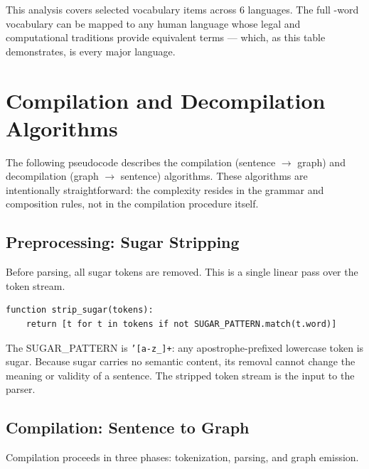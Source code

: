 \documentclass{article}
\begin{document}
This analysis covers selected vocabulary items across 6 languages. The full \VocabTotal-word vocabulary can be mapped to any human language whose legal and computational traditions provide equivalent terms --- which, as this table demonstrates, is every major language.

\section{Compilation and Decompilation Algorithms}

The following pseudocode describes the compilation (sentence $\to$ graph) and decompilation (graph $\to$ sentence) algorithms. These algorithms are intentionally straightforward: the complexity resides in the grammar and composition rules, not in the compilation procedure itself.

\subsection{Preprocessing: Sugar Stripping}

Before parsing, all sugar tokens are removed. This is a single linear pass over the token stream.

\begin{lstlisting}[style=pseudocode]
function strip_sugar(tokens):
    return [t for t in tokens if not SUGAR_PATTERN.match(t.word)]
\end{lstlisting}

The SUGAR\_PATTERN is \texttt{'[a-z\_]+}: any apostrophe-prefixed lowercase token is sugar. Because sugar carries no semantic content, its removal cannot change the meaning or validity of a sentence. The stripped token stream is the input to the parser.

\subsection{Compilation: Sentence to Graph}

Compilation proceeds in three phases: tokenization, parsing, and graph emission.
\end{document}
